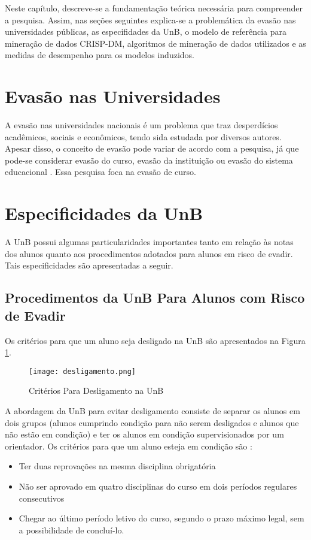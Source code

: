 Neste capítulo, descreve-se a fundamentação teórica necessária para compreender a
pesquisa. Assim, nas seções seguintes explica-se a problemática da evasão nas universidades
públicas, as especifidades da \acrshort{UnB}, o modelo de referência para mineração
de dados CRISP-DM, algoritmos de mineração de dados utilizados e as medidas de
desempenho para os modelos induzidos. 

\section{Evasão nas Universidades} 
A evasão nas universidades nacionais é um problema que traz desperdícios acadêmicos,
sociais e econômicos, tendo sida estudada por diversos autores. Apesar disso, o
conceito de evasão pode variar  de acordo com a pesquisa,
já que pode-se considerar evasão do curso, evasão da instituição ou evasão do
sistema educacional \cite{mec_conceito_evasao}. Essa pesquisa foca na evasão de
curso. 

\section{Especificidades da UnB}
A UnB possui algumas particularidades importantes tanto em relação às notas dos
alunos quanto aos procedimentos adotados para alunos em risco de evadir. Tais
especificidades são apresentadas a seguir. 

\subsection{Procedimentos da UnB Para Alunos com Risco de Evadir}
\par Os critérios para que um aluno seja desligado na UnB são apresentados na Figura \ref{deslig}. 
\begin{figure}[!ht]
    \centering
    \texttt{[image: desligamento.png]}
    \caption{Critérios Para Desligamento na UnB}
    \label{deslig}
\end{figure}
 
A abordagem da UnB para evitar desligamento consiste de separar os alunos em dois
grupos (alunos cumprindo condição para não serem desligados e alunos que não estão em
condição) e ter os alunos em condição supervisionados por um orientador. Os critérios
para que um aluno esteja em condição são
\cite{manual_calouro}: 
\begin{itemize}
    \item Ter duas reprovações na mesma disciplina obrigatória
    \item Não ser aprovado em quatro disciplinas do curso em dois períodos regulares
        consecutivos
    \item Chegar ao último período letivo do curso, segundo o prazo máximo legal, sem
a possibilidade de concluí-lo. 
\end{itemize}

